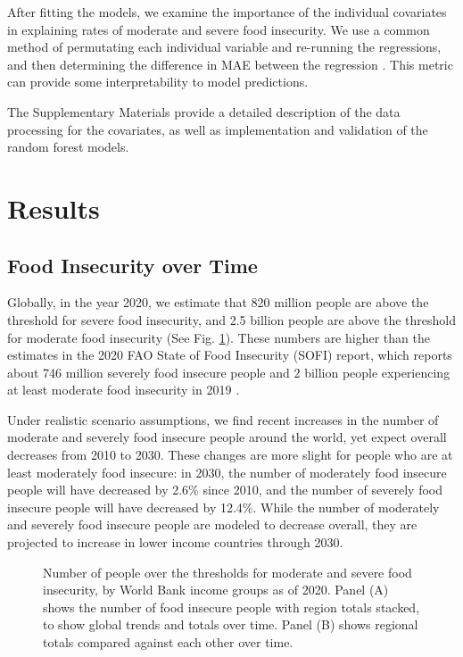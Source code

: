 \documentclass[titlepage]{article}
\begin{document}
After fitting the models, we examine the importance of the individual covariates in explaining rates of moderate and severe food insecurity. We use a common method of permutating each individual variable and re-running the regressions, and then determining the difference in MAE between the regression \cite{ishwaran2007variable, breiman2001random}.  This metric can provide some interpretability to model predictions.

The Supplementary Materials provide a detailed description of the data processing for the covariates, as well as implementation and validation of the random forest models.

\section{Results}
\subsection{Food Insecurity over Time}
Globally, in the year 2020, we estimate that 820 million people are above the threshold for severe food insecurity, and 2.5 billion people are above the threshold for moderate food insecurity (See Fig. \ref{fig:timeseries}). These numbers are higher than the estimates in the 2020 FAO State of Food Insecurity (SOFI) report, which reports about 746 million severely food insecure people and 2 billion people experiencing at least moderate food insecurity in 2019 \cite{sofi2020}. 

Under realistic scenario assumptions, we find recent increases in the number of moderate and severely food insecure people around the world, yet expect overall decreases from 2010 to 2030.  These changes are more slight for people who are at least moderately food insecure: in 2030, the number of moderately food insecure people will have decreased by 2.6\% since 2010, and the number of severely food insecure people will have decreased by 12.4\%.  While the number of moderately and severely food insecure people are modeled to decrease overall, they are projected to increase in lower income countries through 2030.

\begin{figure}[H]
  \centering
  \caption{Number of people over the thresholds for moderate and severe food insecurity, by World Bank income groups as of 2020.  Panel (A) shows the number of food insecure people with region totals stacked, to show global trends and totals over time.  Panel (B) shows regional totals compared against each other over time.}
  \label{fig:timeseries}
\end{figure}
\end{document}
